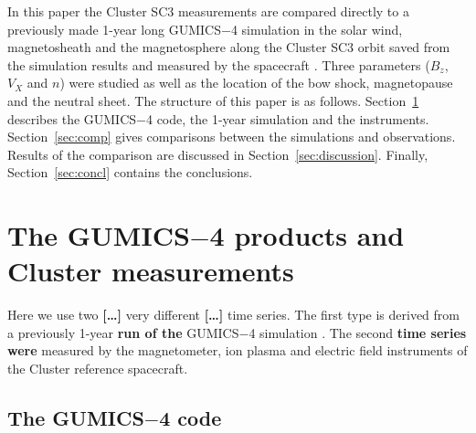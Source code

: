 \documentclass[linenumbers,draft]{agujournal}
\begin{document}
In this paper the Cluster SC3 measurements are compared directly to a previously made 1-year long GUMICS$-$4 simulation in the solar wind, magnetosheath and the magnetosphere along the Cluster SC3 orbit saved from the simulation results and measured by the spacecraft \citep{facsko16:_one_earth}. Three parameters ($B_z$, $V_X$ and $n$) were studied as well as the location of the bow shock, magnetopause and the neutral sheet. The structure of this paper is as follows. Section~\ref{sec:data} describes the GUMICS$-$4 code, the 1-year simulation and the instruments. Section~\ref{sec:comp} gives comparisons between the simulations and observations. Results of the comparison are discussed in Section~\ref{sec:discussion}. Finally, Section~\ref{sec:concl} contains the conclusions.

\section{The GUMICS$-$4 products and Cluster measurements}
\label{sec:data}

Here we use two \textbf{[\dots]} very different \textbf{[\dots]} time series. The first type is derived from a previously 1-year \textbf{run of the} GUMICS$-$4 simulation \citep{facsko16:_one_earth}. The second \textbf{time series were} measured by the magnetometer, ion plasma and electric field instruments of the Cluster reference spacecraft.

\subsection{The GUMICS$-$4 code}
\label{sec:gumics}
\end{document}
